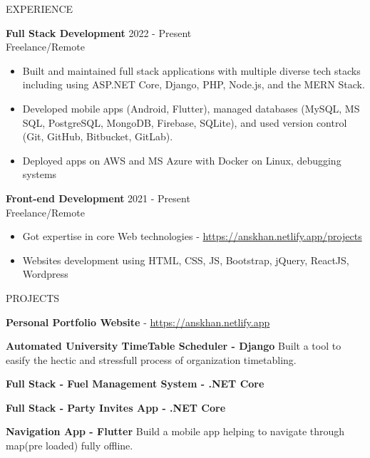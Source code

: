 \documentclass{resume} %
\begin{document}
\begin{rSection}{EXPERIENCE}

\textbf{Full Stack Development} \hfill 2022 - Present\\
Freelance/Remote %
 \begin{itemize}
    \itemsep -3pt {} 
     \item Built and maintained full stack applications with multiple diverse tech stacks including using  ASP.NET Core, Django, PHP, Node.js, and the MERN Stack.
     \item Developed mobile apps (Android, Flutter), managed databases (MySQL, MS SQL, PostgreSQL, MongoDB, Firebase, SQLite), and used version control (Git, GitHub, Bitbucket, GitLab).
     \item Deployed apps on AWS and MS Azure with Docker on Linux, debugging systems 
 \end{itemize}


\textbf{Front-end Development} \hfill 2021  - Present\\
Freelance/Remote  \hfill %
 \begin{itemize}
    \itemsep -3pt {} 
     \item Got expertise in core Web technologies - \href{https://anskhan.netlify.app/projects}{https://anskhan.netlify.app/projects}
     \item Websites development using HTML, CSS, JS, Bootstrap, jQuery, ReactJS, Wordpress
   
 \end{itemize}
 

\end{rSection} 


\begin{rSection}{PROJECTS}
\vspace{-1.25em}
\item \textbf{Personal Portfolio Website}  - \href{https://anskhan.netlify.app}{https://anskhan.netlify.app}
\item \textbf{Automated University TimeTable Scheduler - Django} {Built a tool to easify the hectic and stressfull process of organization timetabling.}
\item \textbf{Full Stack - Fuel Management System - .NET Core}
\item \textbf{Full Stack - Party Invites App - .NET Core}
\item \textbf{Navigation App - Flutter} {Build a mobile app helping to navigate through map(pre loaded) fully offline.}

\end{rSection} 
\end{document}
